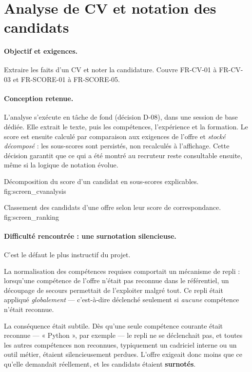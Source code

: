 \section{Analyse de CV et notation des candidats}
\label{sec:impl_scoring}

\paragraph{Objectif et exigences.} Extraire les faits d'un CV et noter la
candidature. Couvre FR-CV-01 à FR-CV-03 et FR-SCORE-01 à FR-SCORE-05.

\paragraph{Conception retenue.} L'analyse s'exécute en tâche de fond
(décision D-08), dans une session de base dédiée. Elle extrait le texte, puis
les compétences, l'expérience et la formation. Le score est ensuite calculé par
comparaison aux exigences de l'offre et \emph{stocké décomposé} : les
sous-scores sont persistés, non recalculés à l'affichage. Cette décision
garantit que ce qui a été montré au recruteur reste consultable ensuite, même
si la logique de notation évolue.

  {Décomposition du score d'un candidat en sous-scores explicables.}
  {fig:screen_cvanalysis}

  {Classement des candidats d'une offre selon leur score de correspondance.}
  {fig:screen_ranking}

\paragraph{Difficulté rencontrée : une surnotation silencieuse.} C'est le
défaut le plus instructif du projet.

La normalisation des compétences requises comportait un mécanisme de repli :
lorsqu'une compétence de l'offre n'était pas reconnue dans le référentiel, un
découpage de secours permettait de l'exploiter malgré tout. Ce repli était
appliqué \emph{globalement} — c'est-à-dire déclenché seulement si
\emph{aucune} compétence n'était reconnue.

La conséquence était subtile. Dès qu'une seule compétence courante était
reconnue — « Python », par exemple — le repli ne se déclenchait pas, et toutes
les autres compétences non reconnues, typiquement un cadriciel interne ou un
outil métier, étaient silencieusement perdues. L'offre exigeait donc moins que
ce qu'elle demandait réellement, et les candidats étaient \textbf{surnotés}.

